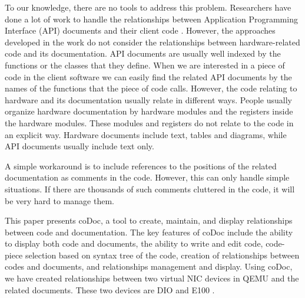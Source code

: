 \documentclass[runningheads,a4paper]{llncs}
\begin{document}
To our knowledge, there are no tools to address this problem.
Researchers have done a lot of work to handle the relationships between Application Programming Interface (API) documents and their client code \cite{Pandita_inferring_2012} \cite{wei_inferring_2011}.
However, the approaches developed in the work do not consider the relationships between hardware-related code and its documentation.
API documents are usually well indexed by the functions or the classes that they define.
When we are interested in a piece of code in the client software
we can easily find the related API documents by the names of the functions that the piece of code calls.
However, the code relating to hardware and its documentation usually relate in different ways.
People usually organize hardware documentation by hardware modules and the registers inside the hardware modules.
These modules and registers do not relate to the code in an explicit way.
Hardware documents include text, tables and diagrams, while API documents usually include text only.

A simple workaround is to include references to the positions of the related documentation as comments in the code.
However, this can only handle simple situations.
If there are thousands of such comments cluttered in the code,
it will be very hard to manage them.

This paper presents coDoc, a tool to create, maintain, and display relationships between code and documentation.
The key features of coDoc include 
the ability to display both code and documents, 
the ability to write and edit code, 
code-piece selection based on syntax tree of the code,
creation of relationships between codes and documents,
and relationships management and display.
Using coDoc, we have created relationships between two virtual NIC devices in QEMU and the related documents.
These two devices are DIO \cite{dio} and E100 \cite{e100}.
\end{document}
